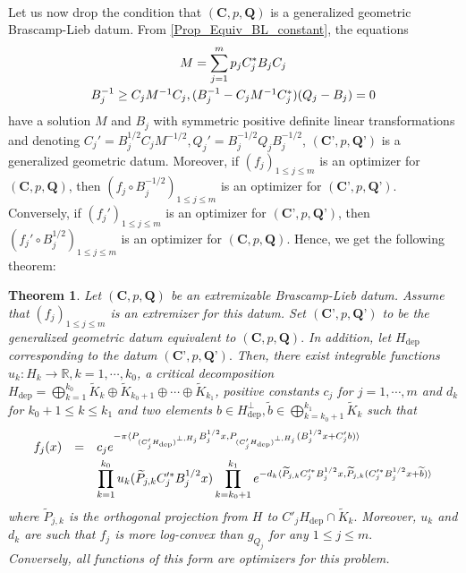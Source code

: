 \documentclass[11pt,a4paper,reqno]{amsart}
\numberwithin{equation}{section}
\newtheorem{theorem}{Theorem}[section]
\theoremstyle{definition}
\newcommand{\nm}{\noalign{\smallskip}}
\newcommand{\ds}{\displaystyle}
\renewcommand{\tilde}{\widetilde}
\newcommand{\<}{\ensuremath \leq}
\renewcommand{\>}{\ensuremath \geq}
\renewcommand{\tilde}{\widetilde}
\begin{document}
\bigskip







\hfill \\ Let us now drop the condition that $(\textbf{C},p,\textbf{Q})$ is a generalized geometric Brascamp-Lieb datum. From \cref{Prop_Equiv_BL_constant}, the equations $$\begin{array}{ccc}
    M = \ds \sum_{j=1}^m p_jC_j^*B_jC_j  \\
    \nm 
     B_j^{-1} \geq C_jM^{-1}C_j, (B_j^{-1}-C_jM^{-1}C_j^*)(Q_j-B_j)=0
\end{array}$$ have a solution $M$ and $B_j$ with symmetric positive definite linear transformations and denoting $C_j'=B_j^{1/2}C_jM^{-1/2}, Q_j'=B_j^{-1/2}Q_jB_j^{-1/2}$, $(\textbf{C'},p,\textbf{Q'})$ is a generalized geometric datum. Moreover, if $(f_j)_{1 \leq j \leq m}$ is an optimizer for $(\textbf{C},p,\textbf{Q})$, then $(f_j \circ B_j^{-1/2})_{1 \leq j \leq m}$ is an optimizer for $(\textbf{C'},p,\textbf{Q'}).$ Conversely, if $(f_j')_{1 \leq j \leq m}$ is an optimizer for $(\textbf{C'},p,\textbf{Q'})$, then $(f_j' \circ B_j^{1/2})_{1 \leq j \leq m}$ is an optimizer for $(\textbf{C},p,\textbf{Q}).$ Hence, we get the following theorem: 

\begin{theorem} \label{Main_Thm_Eq_BL}
    Let $(\textbf{C},p,\textbf{Q})$ be an extremizable Brascamp-Lieb datum. Assume that $(f_j)_{1 \leq j \leq m}$ is an extremizer for this datum. Set $(\textbf{C'},p,\textbf{Q'})$ to be the generalized geometric datum equivalent to $(\textbf{C},p,\textbf{Q}).$ In addition, let $H_\mathrm{dep}$ corresponding to the datum $(\textbf{C'},p,\textbf{Q'}).$ Then, there exist integrable functions $u_k: H_k \rightarrow \mathbb{R}, k=1,\cdots,k_0$, a critical decomposition $H_{\mathrm{dep}}=\bigoplus_{k=1}^{k_0}\tilde K_k \oplus \tilde K_{k_0+1}\oplus \cdots \oplus \tilde K_{k_1}$, positive constants $c_j$ for $j=1,\cdots,m$ and $d_k$ for $k_0+1 \leq k \leq k_1$ and two elements $b \in H_{\mathrm{dep}}^\perp, \tilde b \in \bigoplus_{k=k_0+1}^{k_1}\tilde K_k$ such that $$\begin{array}{lll}
    f_j(x) &=&
    
    \ds c_je^{-\pi \langle P_{(C'_jH_{\mathrm{dep}})^{\perp,H_j}}B_j^{1/2}x,P_{(C'_jH_{\mathrm{dep}})^{\perp,H_j}}(B_j^{1/2}x+C_j'b)\rangle} \\
    \nm 
    && \ds \prod_{k=1}^{k_0}u_k(\tilde P_{j,k}C_j'^*B_j^{1/2}x)\prod_{k=k_0+1}^{k_1}e^{-d_k \langle \tilde P_{j,k}C_j'^*B_j^{1/2}x,\tilde P_{j,k}(C_j'^*B_j^{1/2}x+\tilde b)\rangle} \end{array}$$ where $\tilde P_{j,k}$ is the orthogonal projection from $H$ to $C'_jH_{\mathrm{dep}} \cap \tilde K_k.$ Moreover, $u_k$ and $d_k$ are such that $f_j$ is more log-convex than $g_{Q_j}$ for any $1 \leq j \leq m.$ 
    \hfill \\ Conversely, all functions of this form are optimizers for this problem. 
\end{theorem}
\end{document}
